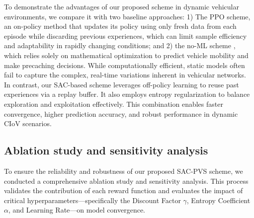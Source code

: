 \documentclass{aims}
\numberwithin{equation}{section}
\begin{document}
To demonstrate the advantages of our proposed scheme in dynamic vehicular environments, we compare it with two baseline approaches:
1) The PPO scheme, an on-policy method that updates its policy using only fresh data from each episode while discarding previous experiences, which can limit sample efficiency and adaptability in rapidly changing conditions; and
2) the no-ML scheme \cite{Nam2023}, which relies solely on mathematical optimization to predict vehicle mobility and make precaching decisions.
While computationally efficient, static models often fail to capture the complex, real-time variations inherent in vehicular networks.
In contrast, our SAC-based scheme leverages off-policy learning to reuse past experiences via a replay buffer.
It also employs entropy regularization to balance exploration and exploitation effectively.
This combination enables faster convergence, higher prediction accuracy, and robust performance in dynamic CIoV scenarios.


\subsection{Ablation study and sensitivity analysis} \label{sec.ablation}
To ensure the reliability and robustness of our proposed SAC-PVS scheme, we conducted a comprehensive ablation study and sensitivity analysis.
This process validates the contribution of each reward function and evaluates the impact of critical hyperparameters—specifically the Discount Factor $\gamma$, Entropy Coefficient $\alpha$, and Learning Rate—on model convergence.
\end{document}
